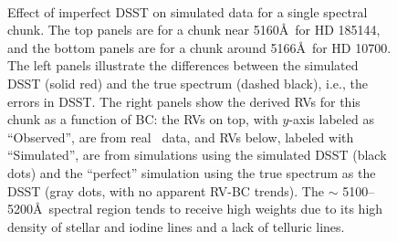 \begin{figure}
\
\caption{Effect of imperfect DSST on simulated data for a single
spectral chunk. The top panels are for a chunk near 5160\AA\ for HD
185144, and the bottom panels are for a chunk around 5166\AA\ for HD
10700. The left panels illustrate the differences between the
simulated DSST (solid red) and the true spectrum (dashed black), i.e.,
the errors in DSST. The right panels show the derived RVs for this
chunk as a function of BC: the RVs on top, with $y$-axis labeled as
``Observed'', are from real \keck\ data, and RVs below, labeled with
``Simulated'', are from simulations using the simulated DSST (black
dots) and the ``perfect'' simulation using the true spectrum as the
DSST (gray dots, with no apparent RV-BC trends). The $\sim$
5100--5200\AA\ spectral region tends to receive high weights due to
its high density of stellar and iodine lines and a lack of telluric
lines.
\label{keck:fig:dsstchunk}}
\end{figure}
